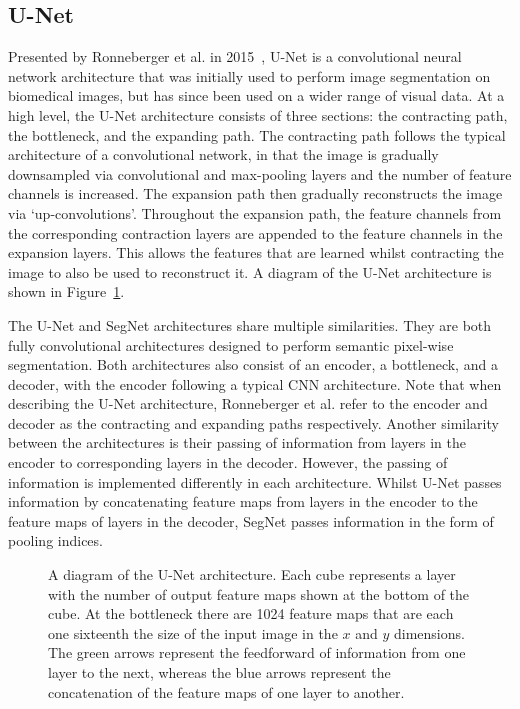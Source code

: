\subsection{U-Net}

Presented by Ronneberger et al. in 2015~\cite{ronneberger2015u}, U-Net is a convolutional neural network architecture that was initially used to perform image segmentation on biomedical images, but has since been used on a wider range of visual data. At a high level, the U-Net architecture consists of three sections: the contracting path, the bottleneck, and the expanding path. The contracting path follows the typical architecture of a convolutional network, in that the image is gradually downsampled via convolutional and max-pooling layers and the number of feature channels is increased. The expansion path then gradually reconstructs the image via `up-convolutions'. Throughout the expansion path, the feature channels from the corresponding contraction layers are appended to the feature channels in the expansion layers. This allows the features that are learned whilst contracting the image to also be used to reconstruct it. A diagram of the U-Net architecture is shown in Figure~\ref{fig:unet}.

The U-Net and SegNet architectures share multiple similarities. They are both fully convolutional architectures designed to perform semantic pixel-wise segmentation. Both architectures also consist of an encoder, a bottleneck, and a decoder, with the encoder following a typical CNN architecture. Note that when describing the U-Net architecture, Ronneberger et al. refer to the encoder and decoder as the contracting and expanding paths respectively. Another similarity between the architectures is their passing of information from layers in the encoder to corresponding layers in the decoder. However, the passing of information is implemented differently in each architecture. Whilst U-Net passes information by concatenating feature maps from layers in the encoder to the feature maps of layers in the decoder, SegNet passes information in the form of pooling indices.

\begin{figure}[t]
    \centering
    
    \caption{A diagram of the U-Net architecture. Each cube represents a layer with the number of output feature maps shown at the bottom of the cube. At the bottleneck there are 1024 feature maps that are each one sixteenth the size of the input image in the $x$ and $y$ dimensions. The green arrows represent the feedforward of information from one layer to the next, whereas the blue arrows represent the concatenation of the feature maps of one layer to another.}
    \label{fig:unet}
\end{figure}

